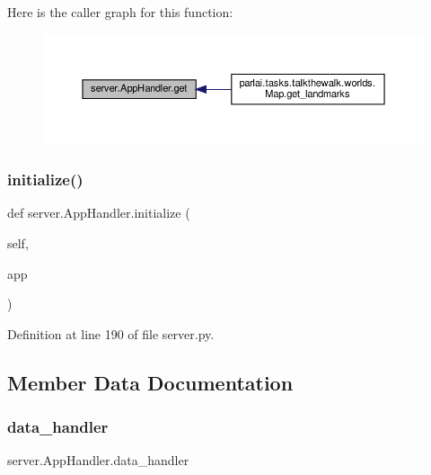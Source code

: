 Here is the caller graph for this function\+:
\nopagebreak
\begin{figure}[H]
\begin{center}
\leavevmode
\includegraphics[width=350pt]{classserver_1_1AppHandler_a3e2f211ff577b8b4173e0d944c62d87f_icgraph}
\end{center}
\end{figure}
\mbox{\label{classserver_1_1AppHandler_a0d57a095eee7c98835d9656fdfb70d2d}} 
\subsubsection{\texorpdfstring{initialize()}{initialize()}}
{\footnotesize\ttfamily def server.\+App\+Handler.\+initialize (\begin{DoxyParamCaption}\item[{}]{self,  }\item[{}]{app }\end{DoxyParamCaption})}



Definition at line 190 of file server.\+py.



\subsection{Member Data Documentation}
\mbox{\label{classserver_1_1AppHandler_abccb1083b9526b6c38970b1db777f254}} 
\subsubsection{\texorpdfstring{data\+\_\+handler}{data\_handler}}
{\footnotesize\ttfamily server.\+App\+Handler.\+data\+\_\+handler}



